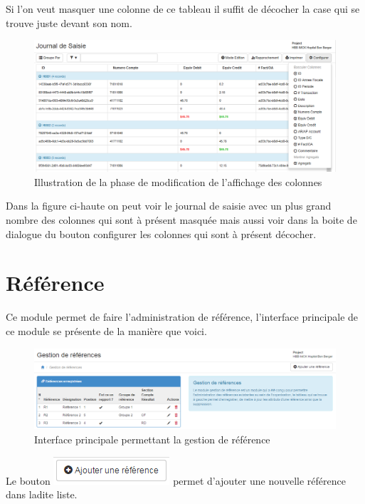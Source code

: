 \documentclass[12pt,a4paper]{report}
\begin{document}
Si l'on veut masquer une colonne de ce tableau il suffit de décocher la case qui se trouve juste devant son nom.
\begin{figure}[h]
\begin{center}
\includegraphics[width=12cm]{pic/MenuConfigurationAction.png}
\end{center}
\caption{Illustration de la phase de modification de l'affichage des colonnes}
\label{Illustration de la phase de modification de l'affichage des colonnes}
\end{figure}

Dans la figure ci-haute on peut voir le journal de saisie avec un plus grand nombre des colonnes qui sont à présent masquée mais aussi voir dans la boite de dialogue du bouton configurer les colonnes qui sont à présent décocher.

\newpage
\section{Référence}
Ce module permet de faire l'administration de référence, l'interface principale de ce module se présente de la manière que voici.

\begin{figure}[h]
\begin{center}
\includegraphics[width=14cm]{pic/GestReference.png}
\end{center}
\caption{Interface principale permettant la gestion de référence}
\label{Interface principale permettant la gestion de référence}
\end{figure}

Le bouton \includegraphics[scale=0.7]{pic/AddReference.png} permet d'ajouter une nouvelle référence dans ladite liste.
\end{document}
